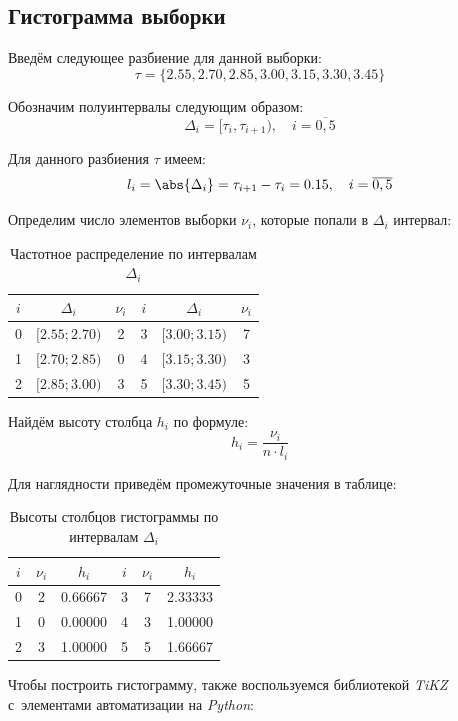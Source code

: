 \subsection{Гистограмма выборки}

Введём следующее разбиение для данной выборки:
\[
    \tau=\{ 2.55, 2.70, 2.85, 3.00, 3.15, 3.30, 3.45 \}
\]

Обозначим полуинтервалы следующим образом:
\[
    \Delta_i=[\tau_i,\tau_{i+1}),\quad i=\overline{0,5}
\]

Для данного разбиения \( \tau \) имеем:
\[
    l_i=\abs{\Delta_i}=\tau_{i+1}-\tau_i=0.15,\quad i=\overline{0,5}
\]

Определим число элементов выборки \( \nu_i \), которые попали в \( \Delta_i \) интервал:

\begin{table}[h!]
\centering
\begin{tabular}{|c|c|c||c|c|c|}
\hline
$i$ & $\Delta_i$ & $\nu_i$ & $i$ & $\Delta_i$ & $\nu_i$ \\ \hline \hline
0 & $[2.55; 2.70)$ & 2 & 3 & $[3.00; 3.15)$ & 7 \\ \hline
1 & $[2.70; 2.85)$ & 0 & 4 & $[3.15; 3.30)$ & 3 \\ \hline
2 & $[2.85; 3.00)$ & 3 & 5 & $[3.30; 3.45)$ & 5 \\ \hline
\end{tabular}
\caption{Частотное распределение по интервалам $\Delta_i$}
\end{table}

Найдём высоту столбца \( h_i \) по формуле:
\[
h_i = \frac{\nu_i}{n\cdot l_i}
\]

Для наглядности приведём промежуточные значения в таблице:

\begin{table}[H]
\centering
\begin{tabular}{|c|c|c||c|c|c|}
\hline
$i$ & $\nu_i$ & $h_i$ & $i$ & $\nu_i$ & $h_i$ \\ \hline \hline
0 & 2 & 0.66667 & 3 & 7 & 2.33333 \\ \hline
1 &  0 & 0.00000 & 4 & 3 & 1.00000 \\ \hline
2 &  3 & 1.00000 & 5 & 5 & 1.66667 \\ \hline
\end{tabular}
\caption{Высоты столбцов гистограммы по интервалам \( \Delta_i \)}
\end{table}

Чтобы построить гистограмму, также воспользуемся библиотекой \textit{TiKZ} с~элементами автоматизации на \textit{Python}:

